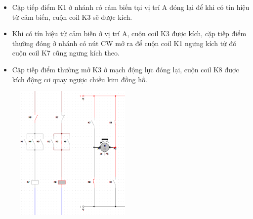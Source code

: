 \begin{itemize}
    \item Cặp tiếp điểm K1 ở nhánh có cảm biến tại vị trí A đóng lại để khi có tín hiệu từ cảm biến, cuộn coil K3 sẽ được kích.
\end{itemize}
\begin{figure}[H]
    \centering
\end{figure}
\begin{itemize}
    \item Khi có tín hiệu từ cảm biến ở vị trí A, cuộn coil K3 được kích, cặp tiếp điểm thường đóng ở nhánh có nút CW mở ra để cuộn coil K1 ngưng kích từ đó cuộn coil K7 cũng ngưng kích theo.
    \item Cặp tiếp điểm thường mở K3 ở mạch động lực đóng lại, cuộn coil K8 được kích động cơ quay ngược chiều kim đồng hồ. 
\end{itemize}
\begin{figure}[H]
    \centering
    \includegraphics[width=0.5\textwidth]{pictures/kichK3.png}
\end{figure}
